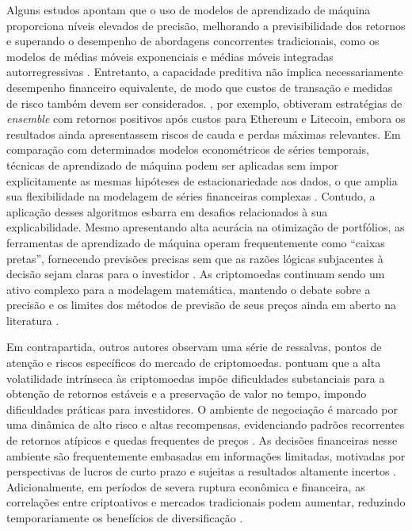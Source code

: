 Alguns estudos apontam que o uso de modelos de aprendizado de máquina proporciona níveis elevados de precisão, melhorando a previsibilidade dos retornos e superando o desempenho de abordagens concorrentes tradicionais, como os modelos de médias móveis exponenciais e médias móveis integradas autorregressivas \cite{sebastiao2021forecasting}. Entretanto, a capacidade preditiva não implica necessariamente desempenho financeiro equivalente, de modo que custos de transação e medidas de risco também devem ser considerados. , por exemplo, obtiveram estratégias de \textit{ensemble} com retornos positivos após custos para Ethereum e Litecoin, embora os resultados ainda apresentassem riscos de cauda e perdas máximas relevantes. Em comparação com determinados modelos econométricos de séries temporais, técnicas de aprendizado de máquina podem ser aplicadas sem impor explicitamente as mesmas hipóteses de estacionariedade aos dados, o que amplia sua flexibilidade na modelagem de séries financeiras complexas \cite{chevallier2021forecast}. Contudo, a aplicação desses algoritmos esbarra em desafios relacionados à sua explicabilidade. Mesmo apresentando alta acurácia na otimização de portfólios, as ferramentas de aprendizado de máquina operam frequentemente como ``caixas pretas'', fornecendo previsões precisas sem que as razões lógicas subjacentes à decisão sejam claras para o investidor \cite{babaei2022explainable}. As criptomoedas continuam sendo um ativo complexo para a modelagem matemática, mantendo o debate sobre a precisão e os limites dos métodos de previsão de seus preços ainda em aberto na literatura \cite{chevallier2021forecast}.

Em contrapartida, outros autores observam uma série de ressalvas, pontos de atenção e riscos específicos do mercado de criptomoedas.  pontuam que a alta volatilidade intrínseca às criptomoedas impõe dificuldades substanciais para a obtenção de retornos estáveis e a preservação de valor no tempo, impondo dificuldades práticas para investidores. O ambiente de negociação é marcado por uma dinâmica de alto risco e altas recompensas, evidenciando padrões recorrentes de retornos atípicos e quedas frequentes de preços \cite{park2023intelligent}. As decisões financeiras nesse ambiente são frequentemente embasadas em informações limitadas, motivadas por perspectivas de lucros de curto prazo e sujeitas a resultados altamente incertos \cite{fang2022cryptocurrency}. Adicionalmente, em períodos de severa ruptura econômica e financeira, as correlações entre criptoativos e mercados tradicionais podem aumentar, reduzindo temporariamente os benefícios de diversificação \cite{corbet2020contagion}.

